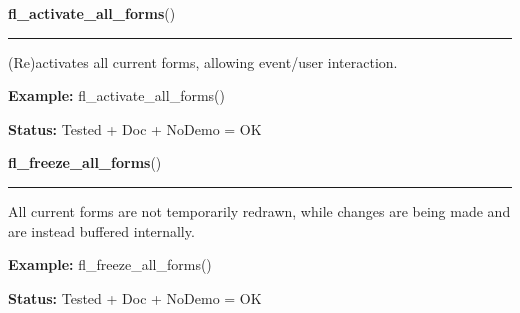     \label{xformslib:flbasic:fl_activate_all_forms}

    \vspace{0.5ex}

\hspace{.8\funcindent}\begin{boxedminipage}{\funcwidth}

    \raggedright \textbf{fl\_activate\_all\_forms}()

    \vspace{-1.5ex}

    \rule{\textwidth}{0.5\fboxrule}
\setlength{\parskip}{2ex}
    (Re)activates all current forms, allowing event/user interaction.

\setlength{\parskip}{1ex}
\textbf{Example:} fl\_activate\_all\_forms()



\textbf{Status:} Tested + Doc + NoDemo = OK



    \end{boxedminipage}

    \label{xformslib:flbasic:fl_freeze_all_forms}

    \vspace{0.5ex}

\hspace{.8\funcindent}\begin{boxedminipage}{\funcwidth}

    \raggedright \textbf{fl\_freeze\_all\_forms}()

    \vspace{-1.5ex}

    \rule{\textwidth}{0.5\fboxrule}
\setlength{\parskip}{2ex}
    All current forms are not temporarily redrawn, while changes are being 
    made and are instead buffered internally.

\setlength{\parskip}{1ex}
\textbf{Example:} fl\_freeze\_all\_forms()



\textbf{Status:} Tested + Doc + NoDemo = OK



    \end{boxedminipage}

    \label{xformslib:flbasic:fl_unfreeze_all_forms}

